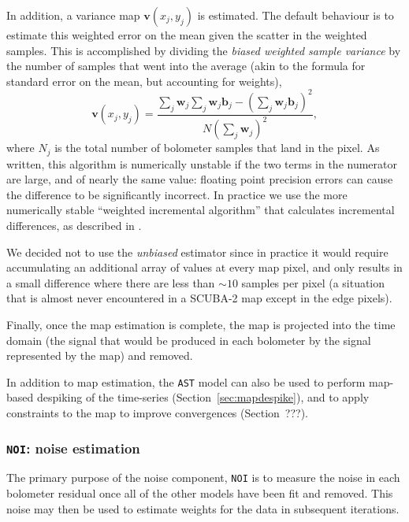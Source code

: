 \documentclass[useAMS,usenatbib,nofootinbib]{mn2e}
\newcommand{\model}[1]{\texttt{#1}}
\begin{document}
In addition, a variance map $\mathbf{v}(x_j,y_j)$ is estimated. The
default behaviour is to estimate this weighted error on the mean given
the scatter in the weighted samples. This is accomplished by dividing
the \emph{biased weighted sample variance} by the number of samples
that went into the average (akin to the formula for standard error on
the mean, but accounting for weights),
%
\begin{equation}
\mathbf{v}(x_j,y_j) = \frac{\sum_j \mathbf{w}_j
                            \sum_j \mathbf{w}_j \mathbf{b}_j -
                            \left( \sum_j \mathbf{w}_j \mathbf{b}_j \right)^2 }
                           { N \left( \sum_j \mathbf{w}_j \right)^2 },
\end{equation}
%
where $N_j$ is the total number of bolometer samples that land in the
pixel. As written, this algorithm is numerically unstable if the two
terms in the numerator are large, and of nearly the same value:
floating point precision errors can cause the difference to be
significantly incorrect. In practice we use the more numerically
stable ``weighted incremental algorithm'' that calculates incremental
differences, as described in \citet{west1979}.

 We decided not to use the \emph{unbiased} estimator since in
practice it would require accumulating an additional array of values
at every map pixel, and only results in a small difference where there
are less than $\sim10$ samples per pixel (a situation that is almost
never encountered in a SCUBA-2 map except in the edge pixels).

Finally, once the map estimation is complete, the map is projected
into the time domain (the signal that would be produced in each
bolometer by the signal represented by the map) and removed.

In addition to map estimation, the \model{AST} model can also be used
to perform map-based despiking of the time-series
(Section~\ref{sec:mapdespike}), and to apply constraints to the map to
improve convergences (Section~???).

\subsubsection{\model{NOI}: noise estimation}
\label{sec:noi}

The primary purpose of the noise component, \model{NOI} is to measure
the noise in each bolometer residual once all of the other models have
been fit and removed. This noise may then be used to estimate weights
for the data in subsequent iterations.
\end{document}
